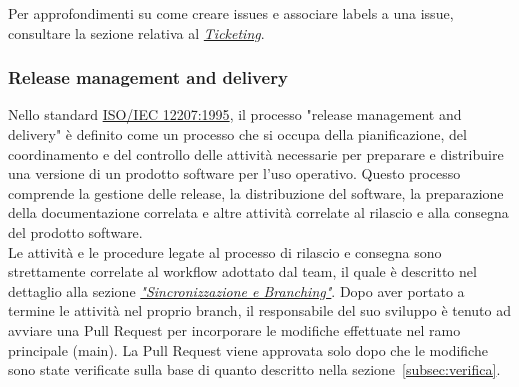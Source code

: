 Per approfondimenti su come creare issues e associare labels a una issue, consultare la sezione relativa al \hyperlink{par:ticketing}{\textit{Ticketing}}.

\subsubsection{Release management and delivery} 
Nello standard \href{https://www.math.unipd.it/~tullio/IS-1/2009/Approfondimenti/ISO_12207-1995.pdf}{ISO/IEC 12207:1995}, il processo "release management and delivery" è definito come un processo che si occupa della pianificazione, del coordinamento e del controllo delle attività necessarie per preparare e distribuire una versione di un prodotto software per l'uso operativo. Questo processo comprende la gestione delle release, la distribuzione del software, la preparazione della documentazione correlata e altre attività correlate al rilascio e alla consegna del prodotto software. \\
Le attività e le procedure legate al processo di rilascio e consegna sono strettamente correlate al workflow adottato dal team, il quale è descritto nel dettaglio alla sezione \hyperlink{par:sincronizzazione&branching}{\textit{"Sincronizzazione e Branching"}}.
Dopo aver portato a termine le attività nel proprio branch, il responsabile del suo sviluppo è tenuto ad avviare una Pull Request per incorporare le modifiche effettuate nel ramo principale (main). La Pull Request viene approvata solo dopo che le modifiche sono state verificate sulla base di quanto descritto nella sezione~\ref{subsec:verifica}.

